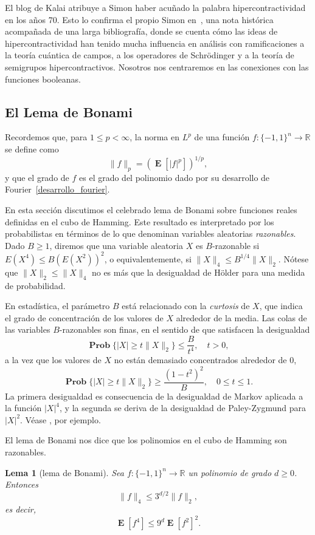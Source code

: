 \documentclass[autocontact]{gaceta}
\newcommand{\R}{\mathbb{R}}
\newtheorem{lemma}{Lema}
\DeclareMathOperator{\EE}{\mathbf{E}}
\DeclareMathOperator{\Prob}{\mathbf{Prob}}
\begin{document}
El blog de Kalai \cite{Kal20a} atribuye a Simon haber acuñado la palabra hipercontractividad en los años 70. Esto lo confirma el propio Simon en~\cite{DGS90}, una nota histórica acompañada de una larga bibliografía, donde se cuenta cómo las ideas de hipercontractividad han tenido mucha influencia en análisis con ramificaciones a la teoría cuántica de campos, a los operadores de Schrödinger y a la teoría de semigrupos hipercontractivos.
Nosotros nos centraremos en las conexiones con las funciones booleanas.

\subsection{El Lema de Bonami}

Recordemos que, para $1\leq p < \infty$, la norma en $L^p$ de una función $f:\{-1,1\}^n\to \R$ se define como
\[
\|f\|_p = \left( \EE[|f|^p] \right)^{1/p},
\]
y que el grado de $f$ es el grado del polinomio dado por su desarrollo de Fourier~\eqref{desarrollo_fourier}.

En esta sección discutimos el celebrado lema de Bonami sobre funciones reales definidas en el cubo de Hamming.
Este resultado es interpretado por los probabilistas en términos de lo que denominan variables aleatorias \emph{razonables}. Dado $B\geq 1$, diremos que una variable aleatoria $X$
es $B$-razonable si $E(X^4)\leq B (E(X^2))^2$, o equivalentemente, si $\|X\|_4\leq B^{1/4} \|X\|_2$. Nótese que $\|X\|_2 \leq \|X\|_4$ no es más que la desigualdad de Hölder para una medida de probabilidad.

En estadística, el parámetro $B$ está relacionado con la \emph{curtosis} de $X$, que indica el grado de concentración de los valores de $X$ alrededor de la media. Las colas de las variables $B$-razonables son finas, en el sentido de que satisfacen la desigualdad
\[
\Prob\big\{ |X|\geq t \|X\|_2 \big\}\leq \frac{B}{t^4}, \quad t>0,
\]
a la vez que los valores de $X$ no están demasiado concentrados alrededor de $0$,
\[
\Prob \big\{ |X|\geq t \|X\|_2 \big\} \geq \frac{(1-t^2)^2}{B}, \quad 0\leq t \leq 1.
\]
La primera desigualdad es consecuencia de la desigualdad de Markov aplicada a la función $|X|^4$, y la segunda se deriva de la desigualdad de Paley-Zygmund para $|X|^2$. Véase
\cite[sección 9.1]{O'Do21}, por ejemplo.

El lema de Bonami nos dice que los polinomios en el cubo de Hamming son razonables.

\begin{lemma}[lema de Bonami]\label{lem:Bonami's}
Sea $f:\{-1,1\}^n\to \R$ un polinomio de grado $d\geq 0$. Entonces
\[
\|f\|_4\leq 3^{d/2}\|f\|_2,
\]
es decir,
\[
\EE[f^4]\leq 9^d \EE[f^2]^2.
\]
\end{lemma}
\end{document}
